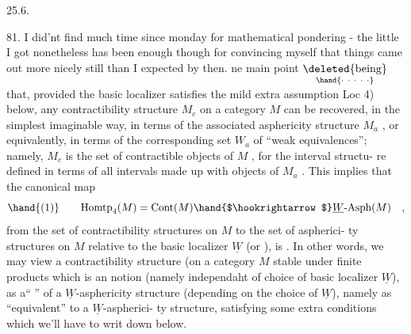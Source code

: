 
25.6.

81. I did'nt find much time since monday for mathematical pondering -
the little I got nonetheless has been enough though for convincing myself
that things came out  more nicely still than I expected by then. \hand{\unsure{--}} ne
main point \(\underset{\hand{\cdot\ \cdot\ \cdot\ \cdot\ \cdot}}{\text{\deleted{being}}}\) that, provided the basic localizer  satisfies the mild
extra assumption Loc 4) below, any contractibility structure $M_c$ on a
category $M$   can be recovered, in the simplest imaginable way, in
terms of the associated asphericity structure $M_a$ , or equivalently, in
terms of the corresponding set $W_a$ of ``weak equivalences''; namely, $M_c$
is the set of contractible objects of $M$ , for the   interval structu-%
re defined in terms of all intervals made up with objects of $M_a$  . This
implies that the canonical map
\[ \hand{(1)} \qquad \mathrm{Homtp}_4(M) = \mathrm{Cont}(M) \hand{$\hookrightarrow$} \underline{W}\text{-}\mathrm{Asph}(M) \quad , \]
from the set of contractibility structures on $M$ to the set of aspherici-%
ty structures on $M$ relative to the basic localizer $\underline{W}$ (or ), is \hand{\uline{\textcolor{black}{injective}}}. In other words, we may view 
a contractibility structure (on a category $M$ stable under finite products\hand{),}
which is an \hand{\uline{\textcolor{black}{absolute}}} notion (namely independaht of  choice of 
 basic localizer $\underline{W}$), as a``\hand{\uline{\textcolor{black}{particular}}} \hand{\uline{\textcolor{black}{case}}}'' of a $\underline{W}$-asphericity structure
(depending on the choice of $\underline{W}$), namely as ``equivalent'' to a $\underline{W}$-aspherici-%
ty structure, satisfying some extra conditions which we'll have to writ
down below. \hand{//}

